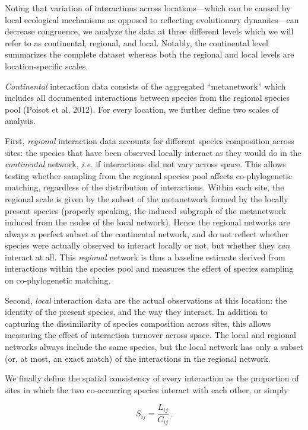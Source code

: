 \documentclass[12pt]{article}
\begin{document}
Noting that variation of interactions across locations---which can be
caused by local ecological mechanisms as opposed to reflecting
evolutionary dynamics---can decrease congruence, we analyze the data at
three different levels which we will refer to as continental, regional,
and local. Notably, the continental level summarizes the complete
dataset whereas both the regional and local levels are location-specific
scales.

\emph{Continental} interaction data consists of the aggregated
\enquote{metanetwork} which includes all documented interactions between
species from the regional species pool (Poisot et al. 2012). For every
location, we further define two scales of analysis.

First, \emph{regional} interaction data accounts for different species
composition across sites: the species that have been observed locally
interact as they would do in the \emph{continental} network, \emph{i.e.}
if interactions did not vary across space. This allows testing whether
sampling from the regional species pool affects co-phylogenetic
matching, regardless of the distribution of interactions. Within each
site, the regional scale is given by the subset of the metanetwork
formed by the locally present species (properly speaking, the induced
subgraph of the metanetwork induced from the nodes of the local
network). Hence the regional networks are always a perfect subset of the
continental network, and do not reflect whether species were actually
observed to interact locally or not, but whether they \emph{can}
interact at all. This \emph{regional} network is thus a baseline
estimate derived from interactions within the species pool and measures
the effect of species sampling on co-phylogenetic matching.

Second, \emph{local} interaction data are the actual observations at
this location: the identity of the present species, and the way they
interact. In addition to capturing the dissimilarity of species
composition across sites, this allows measuring the effect of
interaction turnover across space. The local and regional networks
always include the same species, but the local network has only a subset
(or, at most, an exact match) of the interactions in the regional
network.

We finally define the spatial consistency of every interaction as the
proportion of sites in which the two co-occurring species interact with
each other, or simply

\begin{equation} S_{ij} = \frac{L_{ij}}{C_{ij}}\,. \label{eq:linktunover}\end{equation}
\end{document}
